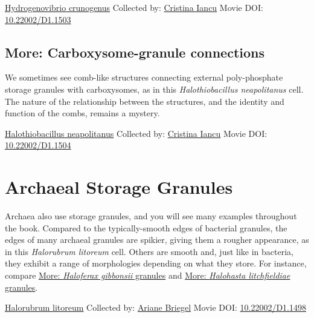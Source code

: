 \documentclass[]{tufte-book}
\begin{document}
\hypertarget{htmlwidget-8a9c09f094667acb0af1}{}

\label{fig:4-9a}\protect\hyperlink{tree}{Hydrogenovibrio crunogenus} Collected by: \protect\hyperlink{cristina_iancu}{Cristina Iancu} Movie DOI: \href{https://doi.org/10.22002/D1.1503}{10.22002/D1.1503}

\hypertarget{Carboxysome-granule_connections}{%
\subsection*{More: Carboxysome-granule connections}\label{Carboxysome-granule_connections}}

We sometimes see comb-like structures connecting external poly-phosphate storage granules with carboxysomes, as in this \emph{Halothiobacillus neapolitanus} cell. The nature of the relationship between the structures, and the identity and function of the combs, remains a mystery.



\hypertarget{htmlwidget-d50e6e758462126ba1ea}{}

\label{fig:4-9b}\protect\hyperlink{tree}{Halothiobacillus neapolitanus} Collected by: \protect\hyperlink{cristina_iancu}{Cristina Iancu} Movie DOI: \href{https://doi.org/10.22002/D1.1504}{10.22002/D1.1504}

\hypertarget{archaeal-storage-granules}{%
\section{Archaeal Storage Granules}\label{archaeal-storage-granules}}

Archaea also use storage granules, and you will see many examples throughout the book. Compared to the typically-smooth edges of bacterial granules, the edges of many archaeal granules are spikier, giving them a rougher appearance, as in this \emph{Halorubrum litoreum} cell. Others are smooth and, just like in bacteria, they exhibit a range of morphologies depending on what they store. For instance, compare \protect\hyperlink{ux2aHaloferax_gibbonsiiux2a_granules}{More: \emph{Haloferax gibbonsii} granules} and \protect\hyperlink{ux2aHalohasta_litchfieldiaeux2a_granules}{More: \emph{Halohasta litchfieldiae} granules}.



\hypertarget{htmlwidget-b8b1c6d2bd2ea4921270}{}

\label{fig:4-10}\protect\hyperlink{tree}{Halorubrum litoreum} Collected by: \protect\hyperlink{ariane_briegel}{Ariane Briegel} Movie DOI: \href{https://doi.org/10.22002/D1.1498}{10.22002/D1.1498}
\end{document}

